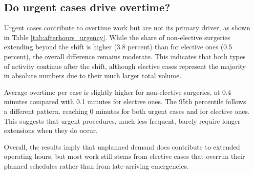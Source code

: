 \documentclass[
]{article}
\begin{document}
\subsection{Do urgent cases drive
overtime?}\label{do-urgent-cases-drive-overtime}

Urgent cases contribute to overtime work but are not its primary driver,
as shown in Table \ref{tab:afterhours_urgency}. While the share of
non-elective surgeries extending beyond the shift is higher (3.8
percent) than for elective ones (0.5 percent), the overall difference
remains moderate. This indicates that both types of activity continue
after the shift, although elective cases represent the majority in
absolute numbers due to their much larger total volume.

Average overtime per case is slightly higher for non-elective surgeries,
at 0.4 minutes compared with 0.1 minutes for elective ones. The 95th
percentile follows a different pattern, reaching 0 minutes for both
urgent cases and for elective ones. This suggests that urgent
procedures, much less frequent, barely require longer extensions when
they do occur.

Overall, the results imply that unplanned demand does contribute to
extended operating hours, but most work still stems from elective cases
that overrun their planned schedules rather than from late-arriving
emergencies.
\end{document}
